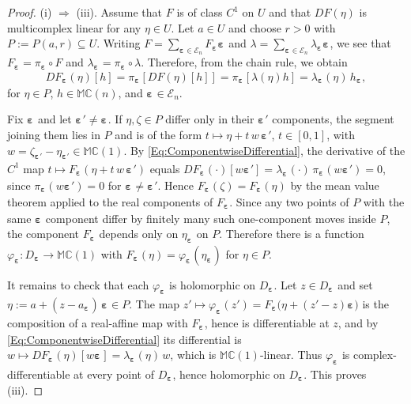 \documentclass[10pt,a4paper]{amsart}
\newcommand{\Ra}{\Rightarrow}
\newcommand{\bep}[1]{\bm{\varepsilon_{#1}}}
\newcommand{\mC}{\mathbb{C}}
\newcommand{\mM}{\mathbb{M}}
\newcommand{\ra}{\rightarrow}
\begin{document}
\begin{proof}
    (i) $\Ra$ (iii). Assume that $F$ is of class $C^1$ on $U$ and that $DF (\eta )$ is multicomplex linear for any $\eta \in U$. Let $a \in U$ and choose $r > 0$ with $P := P ( a , r ) \subseteq U$. Writing $F = \sum_{\bep{} \in \mathcal{E}_n} F_{\bep{}} \bep{}$ and $\lambda = \sum_{\bep{} \in \mathcal{E}_n} \lambda_{\bep{}} \bep{}$, we see that $F_{\bep{}} = \pi_{\bep{}} \circ F$ and $\lambda_{\bep{}} = \pi_{\bep{}} \circ \lambda$. Therefore, from the chain rule, we obtain
        \begin{equation}\label{Eq:ComponentwiseDifferential}
        D F_{\bep{}} (\eta ) [ h ] = \pi_{\bep{}} [DF (\eta ) [h] ] = \pi_{\bep{}} [\lambda (\eta ) h] = \lambda_{\bep{}} (\eta )\, h_{\bep{}} ,
        \end{equation}
    for $\eta \in P$, $h \in \mM \mC(n)$, and $ \bep{} \in \mathcal{E}_n$. 

    Fix $\bep{}$ and let $\bep{}' \neq \bep{}$. If $\eta , \zeta \in P$ differ only in
    their $\bep{}'$ components, the segment joining them lies in $P$ and is of
    the form $t \mapsto \eta + t\, w\, \bep{}'$, $t \in [ 0 , 1 ]$, with $w = \zeta_{\bep{}'} - \eta_{\bep{}'} \in \mM \mC (1)$.
    By \eqref{Eq:ComponentwiseDifferential}, the derivative of the $C^1$ map $t \mapsto F_{\bep{}} ( \eta + t\, w\, \bep{}' )$
    equals $D F_{\bep{}} ( \cdot ) [ w \bep{}' ] = \lambda_{\bep{}} ( \cdot )\,
    \pi_{\bep{}} ( w \bep{}' ) = 0$, since $\pi_{\bep{}} ( w \bep{}' ) = 0$ for $\bep{} \neq \bep{}'$. Hence
    $F_{\bep{}} ( \zeta ) = F_{\bep{}} ( \eta )$ by the mean value theorem applied to the real components of $F_{\bep{}}$. Since any two points of $P$ with the
    same $\bep{}$ component differ by finitely many such one-component moves
    inside $P$, the component $F_{\bep{}}$ depends only on $\eta_{\bep{}}$ on $P$. Therefore there is
    a function $\varphi_{\bep{}} : D_{\bep{}} \ra \mM \mC(1)$ with
    $F_{\bep{}} (\eta ) = \varphi_{\bep{}} ( \eta_{\bep{}} )$ for $\eta \in P$.

    It remains to check that each $\varphi_{\bep{}}$ is holomorphic on $D_{\bep{}}$. Let
    $z \in D_{\bep{}}$ and set $\eta := a + ( z - a_{\bep{}} )\, \bep{} \in P$. The map
    $z ' \mapsto \varphi_{\bep{}} ( z ' ) = F_{\bep{}} \big( \eta + ( z ' - z ) \bep{} \big)$
    is the composition of a real-affine map with $F_{\bep{}}$, hence is differentiable at $z$, and by \eqref{Eq:ComponentwiseDifferential} its
    differential is $w \mapsto D F_{\bep{}} (\eta ) [ w \bep{} ] =
    \lambda_{\bep{}} (\eta )\, w$, which is $\mM \mC(1)$-linear. Thus $\varphi_{\bep{}}$ is
    complex-differentiable at every point of $D_{\bep{}}$, hence holomorphic on
    $D_{\bep{}}$. This proves (iii).


\end{proof}
\end{document}
